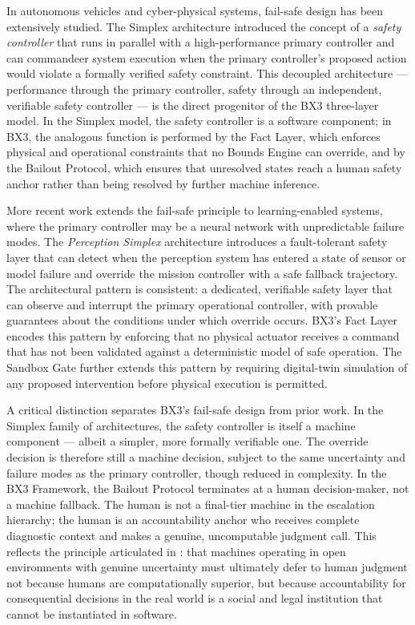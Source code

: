 \documentclass[12pt]{article}
\begin{document}
In autonomous vehicles and cyber-physical systems, fail-safe design has been extensively studied. The Simplex architecture \cite{bansal2019} introduced the concept of a \textit{safety controller} that runs in parallel with a high-performance primary controller and can commandeer system execution when the primary controller's proposed action would violate a formally verified safety constraint. This decoupled architecture --- performance through the primary controller, safety through an independent, verifiable safety controller --- is the direct progenitor of the BX3 three-layer model. In the Simplex model, the safety controller is a software component; in BX3, the analogous function is performed by the Fact Layer, which enforces physical and operational constraints that no Bounds Engine can override, and by the Bailout Protocol, which ensures that unresolved states reach a human safety anchor rather than being resolved by further machine inference.

More recent work \cite{bansal2019} extends the fail-safe principle to learning-enabled systems, where the primary controller may be a neural network with unpredictable failure modes. The \textit{Perception Simplex} architecture introduces a fault-tolerant safety layer that can detect when the perception system has entered a state of sensor or model failure and override the mission controller with a safe fallback trajectory. The architectural pattern is consistent: a dedicated, verifiable safety layer that can observe and interrupt the primary operational controller, with provable guarantees about the conditions under which override occurs. BX3's Fact Layer encodes this pattern by enforcing that no physical actuator receives a command that has not been validated against a deterministic model of safe operation. The Sandbox Gate further extends this pattern by requiring digital-twin simulation of any proposed intervention before physical execution is permitted.

A critical distinction separates BX3's fail-safe design from prior work. In the Simplex family of architectures, the safety controller is itself a machine component --- albeit a simpler, more formally verifiable one. The override decision is therefore still a machine decision, subject to the same uncertainty and failure modes as the primary controller, though reduced in complexity. In the BX3 Framework, the Bailout Protocol terminates at a human decision-maker, not a machine fallback. The human is not a final-tier machine in the escalation hierarchy; the human is an accountability anchor who receives complete diagnostic context and makes a genuine, uncomputable judgment call. This reflects the principle articulated in \cite{wiener1948}: that machines operating in open environments with genuine uncertainty must ultimately defer to human judgment not because humans are computationally superior, but because accountability for consequential decisions in the real world is a social and legal institution that cannot be instantiated in software.
\end{document}
